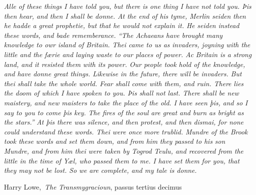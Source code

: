 \emph{Alle of these things I have told you, but there is one thing I
have not told you. Þis then hear, and then I shall be donne. At the end
of his tyme, Merlin seiden then he hadde a great prophetie, but that he
would not explain it. He seiden instead these words, and bade
rememberance.} \emph{``The Achaeans have brought many knowledge to owr
island of Britain. Thei came to us as invaders, joyning with the little
and the færie and laying waste to our places of power. Ac Britain is a
strong land, and it resisted them with its power. Our people took hold
of the knowledge, and have donne great things. Likewise in the future,
there will be invaders. But thei shall take the whole world. Fear shall
come with them, and ruin. There lies the doom of which I have spoken to
you. Þis shall not last. There shall be new maistery, and new maisters
to take the place of the old. I have seen þis, and so I say to you to
come þis key. The fires of the soul are great and burn as bright as the
stars.''} \emph{At þis there was silence, and then protest, and then
dismai, for none could understand these words. Thei were once more
trublid. Mundre of the Brook took these words and set them down, and
from him they passed to his son Mundre, and from him thei were taken by
Togrod Teulu, and recovered from the little in the time of Yæl, who
passed them to me. I have set them for you, that they may not be lost.
So we are complete, and my tale is donne.}

Harry Lowe,~\emph{The Transmygracioun}, passus tertius decimus

